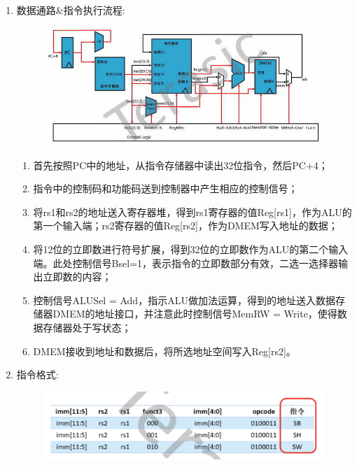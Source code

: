 \documentclass[a4paper, 14pt, oneside]{book} %
\numberwithin{equation}{subsection}
\begin{document}
\begin{enumerate}
\begin{enumerate}
\begin{figure}[!htbp]
								\end{figure}
						\item{数据通路\&指令执行流程:}
							\begin{figure}[!htbp]
								\centering
								\includegraphics[scale=0.5]{img/s2.png}
							\end{figure}
							\begin{enumerate}
								\item
									首先按照PC中的地址，从指令存储器中读出32位指令，然后PC+4；
								\item
									指令中的控制码和功能码送到控制器中产生相应的控制信号；
								\item
									将rs1和rs2的地址送入寄存器堆，得到rs1寄存器的值Reg[rs1]，作为ALU的第一个输入端；rs2寄存器的值Reg[rs2]，作为DMEM写入地址的数据；
								\item
									将12位的立即数进行符号扩展，得到32位的立即数作为ALU的第二个输入端。此处控制信号Bsel=1，表示指令的立即数部分有效，二选一选择器输出立即数的内容；
								\item
									控制信号ALUSel = Add，指示ALU做加法运算，得到的地址送入数据存储器DMEM的地址接口，并注意此时控制信号MemRW = Write，使得数据存储器处于写状态；
								\item 
									DMEM接收到地址和数据后，将所选地址空间写入Reg[rs2]。
							\end{enumerate}
						\item{指令格式:}
							\begin{figure}[!htbp]
								\centering
								\includegraphics[scale=0.5]{img/s3.png}
							\end{figure}

\end{enumerate}
\end{enumerate}
\end{document}

